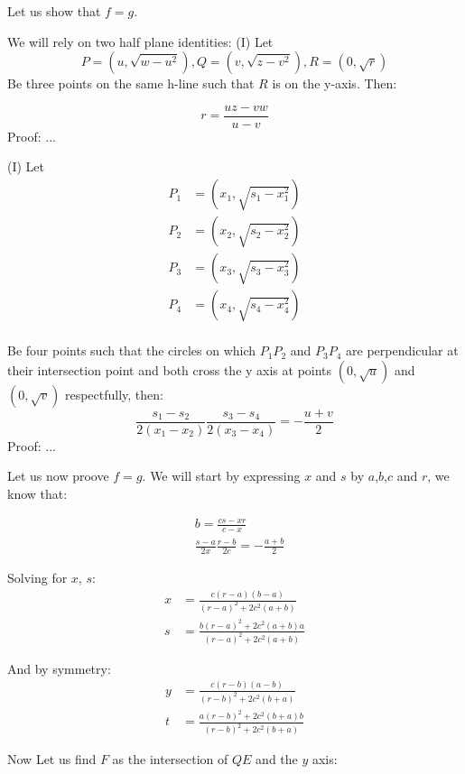 \documentclass[a4paper,10pt]{article}
\begin{document}
Let us show that $f = g$.

\noindent
We will rely on two half plane identities:
(I) Let
\[
P=\left(u, \sqrt{w - u^2}\right),Q=\left(v, \sqrt{z - v^2}\right),R=\left(0, \sqrt{r}\right)
\]
Be three points on the same h-line such that $R$ is on the y-axis. Then:

\[
  r = \frac{uz - vw}{u - v}
\]
Proof:
...

(I) Let
\begin{align*}
P_1 &= \left(x_1, \sqrt{s_1 - x_1^2}\right)\\
P_2 &= \left(x_2, \sqrt{s_2 - x_2^2}\right)\\
P_3 &= \left(x_3, \sqrt{s_3 - x_3^2}\right)\\
P_4 &= \left(x_4, \sqrt{s_4 - x_4^2}\right)\\
\end{align*}

Be four points such that the circles on which $P_1P_2$ and $P_3P_4$
are perpendicular at their intersection point and both cross the y 
axis at points $(0,\sqrt{u})$ and $(0,\sqrt{v})$ respectfully, then:
\[
\frac{s_1 - s_2}{2\left(x_1 - x_2\right)} \frac{s_3 - s_4}{2\left(x_3 - x_4\right)} = -\frac{u+v}{2}
\]
Proof:
...

Let us now proove $f=g$.
We will start by expressing $x$ and $s$ by $a$,$b$,$c$ and $r$, we know that:

\begin{align*}
&b = \frac{cs - xr}{c - x} \\
&\frac{s - a}{2x} \frac{r - b}{2c} = -\frac{a+b}{2}
\end{align*}

Solving for $x$, $s$:
\begin{align*}
x &= \frac{c\left(r - a\right)\left(b - a\right)}{\left(r - a\right)^2 + 2c^2\left(a + b\right)}\\
s &= \frac{b\left(r - a\right)^2 + 2c^2\left(a + b\right)a}{\left(r - a\right)^2 + 2c^2\left(a + b\right)}
\end{align*}

And by symmetry:
\begin{align*}
y &= \frac{c\left(r - b\right)\left(a - b\right)}{\left(r - b\right)^2 + 2c^2\left(b + a\right)}\\
t &= \frac{a\left(r - b\right)^2 + 2c^2\left(b + a\right)b}{\left(r - b\right)^2 + 2c^2\left(b + a\right)}
\end{align*}

Now Let us find $F$ as the intersection of $QE$ and the $y$ axis:
\end{document}

